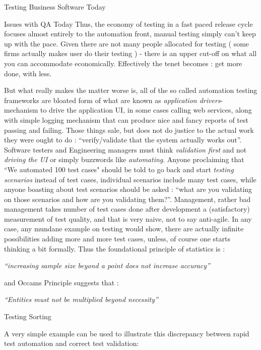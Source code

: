 \begin{section}{Testing Business Software Today}
\begin{subsection}{Issues with QA Today}
Thus, the economy of testing in a fast paced release cycle focuses almost entirely to the automation front, manual testing simply can't keep up with the pace.  Given there are not  many people allocated for testing ( some firms actually makes user do their testing ) - there is an upper cut-off on what all you can accommodate economically. Effectively the tenet becomes :  get more done, with less. 

But what really makes the matter worse is, all of the so called automation testing frameworks are bloated form of  what are known as \emph{application drivers}- mechanism to drive the application UI, in some cases calling web services,  along with simple logging mechanism that can produce nice and fancy reports of test passing and failing. Those things  sale, but does not do justice to the actual work they were ought to do : ``verify/validate that the system actually works out''. Software testers and Engineering managers must think \emph{validation first} and not \emph{driving the UI} or simply buzzwords like \emph{automating}.  Anyone proclaiming that ``We automated 100 test cases" should be told to go back and start \emph{testing scenarios} instead of test cases, individual scenarios include many test cases, while anyone  boasting about test scenarios should be asked : ``what are you validating on those scenarios and how are you validating them?''. Management, rather bad management takes number of test cases done after development a (satisfactory) measurement of test quality, and that is very naive, not to say anti-agile. In any case, any mundane example on testing would show, there are actually infinite possibilities adding more and more test cases, unless, of course one starts thinking a bit formally. Thus the foundational principle of statistics is :

\begin{center}
\emph{ ``increasing sample size beyond a point does not increase accuracy'' }
\end{center}

and Occams Principle suggests that : 

\begin{center}
\emph{ ``Entities must not be multiplied beyond necessity'' }
\end{center}

\end{subsection}

\begin{subsection}{Testing Sorting}

A very simple example can be used to illustrate this discrepancy between rapid test automation and correct test validation:


\end{subsection}
\end{section}
